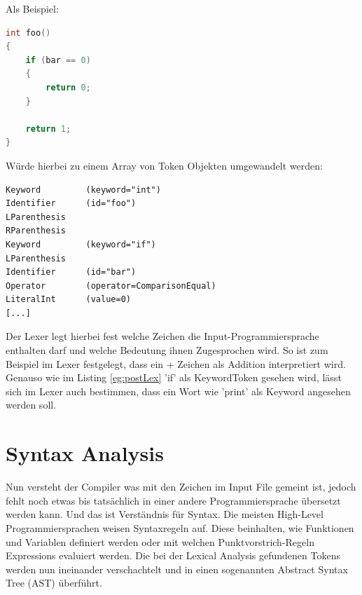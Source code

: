 Als Beispiel:

\begin{lstlisting}[language=C, label=eg:preLex, caption=C code vor Lexical Analysis]
int foo()
{
    if (bar == 0)
    {
        return 0;
    }

    return 1;
}
\end{lstlisting}

Würde hierbei zu einem Array von Token Objekten umgewandelt werden:

\begin{lstlisting}[label=eg:postLex, caption=Tokens nach Lexical Analysis]
Keyword         (keyword="int")
Identifier      (id="foo")
LParenthesis
RParenthesis
Keyword         (keyword="if")
LParenthesis
Identifier      (id="bar")
Operator        (operator=ComparisonEqual)
LiteralInt      (value=0)
[...]
\end{lstlisting}

Der Lexer legt hierbei fest welche Zeichen die Input-Programmiersprache enthalten darf und welche Bedeutung ihnen Zugesprochen wird. So ist zum Beispiel im Lexer festgelegt, dass ein + Zeichen als Addition interpretiert wird.
Genauso wie im Listing \ref{eg:postLex} 'if' als KeywordToken gesehen wird, lässt sich im Lexer auch bestimmen, dass ein Wort wie 'print' als Keyword angesehen werden soll.

\section{Syntax Analysis}
Nun versteht der Compiler was mit den Zeichen im Input File gemeint ist, jedoch fehlt noch etwas bis tatsächlich in einer andere Programmiersprache übersetzt werden kann. Und das ist Verständnis für Syntax.
Die meisten High-Level Programmiersprachen weisen Syntaxregeln auf. Diese beinhalten, wie Funktionen und Variablen definiert werden oder mit welchen Punktvorstrich-Regeln Expressions evaluiert werden.
Die bei der Lexical Analysis gefundenen Tokens werden nun ineinander verschachtelt und in einen sogenannten Abstract Syntax Tree (AST) überführt.


